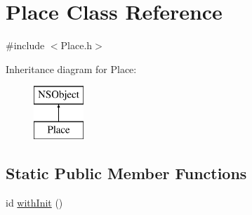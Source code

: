 \hypertarget{interface_place}{
\section{\-Place \-Class \-Reference}
\label{interface_place}
}


{\ttfamily \#include $<$\-Place.\-h$>$}

\-Inheritance diagram for \-Place\-:\begin{figure}[H]
\begin{center}
\leavevmode
\includegraphics[height=2.000000cm]{interface_place}
\end{center}
\end{figure}
\subsection*{\-Static \-Public \-Member \-Functions}
\begin{DoxyCompactItemize}
\item 
id \hyperlink{interface_place_a84410078d1276910ffdd5c7f3d04d0b5}{with\-Init} ()
\end{DoxyCompactItemize}
